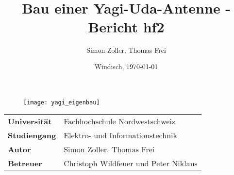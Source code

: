\documentclass[final]{fhnwreport}       %
\title{Bau einer Yagi-Uda-Antenne - Bericht hf2}          %
\author{Simon Zoller, Thomas Frei}          %
\date{Windisch, \today}             %
\begin{document}
\maketitle

\vspace*{-1cm}						    %
\vfill
\begin{figure}[H]
\centering
\texttt{[image: yagi\_eigenbau]}
\end{figure}
\vfill

{
\renewcommand\arraystretch{2}
\begin{center}
\begin{tabular}{>{\bf}p{4cm} l}
Universität                &    Fachhochschule Nordwestschweiz\\
Studiengang                &    Elektro- und Informationstechnik\\
Autor   		               & 	  Simon Zoller, Thomas Frei\\
Betreuer                   &    Christoph Wildfeuer und Peter Niklaus\\
\end{tabular}
\end{center}
}

\clearpage

\thispagestyle{empty}


\tableofcontents
\clearpage










{\sloppypar
\printbibliography[heading=bibintoc]
\label{sec:lit}
}

%

{%
}
\end{document}
